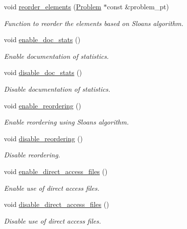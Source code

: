 \begin{DoxyCompactItemize}
void \hyperlink{classoomph_1_1HSL__MA42_a6ea4a5adf63088f155b81ab650f44347}{reorder\+\_\+elements} (\hyperlink{classoomph_1_1Problem}{Problem} $\ast$const \&problem\+\_\+pt)
\begin{DoxyCompactList}\small\item\em Function to reorder the elements based on Sloan\textquotesingle{}s algorithm. \end{DoxyCompactList}\item 
void \hyperlink{classoomph_1_1HSL__MA42_a52f7aec686418a4210ab8bd010eb332a}{enable\+\_\+doc\+\_\+stats} ()
\begin{DoxyCompactList}\small\item\em Enable documentation of statistics. \end{DoxyCompactList}\item 
void \hyperlink{classoomph_1_1HSL__MA42_aeb9ed583870a140508c8eb77ceecf3b2}{disable\+\_\+doc\+\_\+stats} ()
\begin{DoxyCompactList}\small\item\em Disable documentation of statistics. \end{DoxyCompactList}\item 
void \hyperlink{classoomph_1_1HSL__MA42_a889fe388a889c71316e26a15ed3e3d78}{enable\+\_\+reordering} ()
\begin{DoxyCompactList}\small\item\em Enable reordering using Sloan\textquotesingle{}s algorithm. \end{DoxyCompactList}\item 
void \hyperlink{classoomph_1_1HSL__MA42_a9fa85bebbf456888d454ffb8b8783089}{disable\+\_\+reordering} ()
\begin{DoxyCompactList}\small\item\em Disable reordering. \end{DoxyCompactList}\item 
void \hyperlink{classoomph_1_1HSL__MA42_a89c5b22abcd421441ae6c6bc51a6a45e}{enable\+\_\+direct\+\_\+access\+\_\+files} ()
\begin{DoxyCompactList}\small\item\em Enable use of direct access files. \end{DoxyCompactList}\item 
void \hyperlink{classoomph_1_1HSL__MA42_a3a097433f26487e9d741b999beb03681}{disable\+\_\+direct\+\_\+access\+\_\+files} ()
\begin{DoxyCompactList}\small\item\em Disable use of direct access files. \end{DoxyCompactList}\item 

\end{DoxyCompactItemize}
